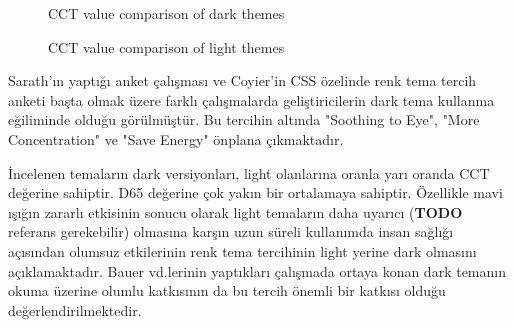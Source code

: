 \documentclass{article}
\begin{document}
\begin{figure}[H]
  \caption{CCT value comparison of dark themes}
  \label{fig:dark-compare}
\end{figure}

\lighttable
\pgfplotstabletranspose[colnames from=themes]\tablelight{\lighttable}

\begin{figure}[H]
  \caption{CCT value comparison of light themes}
  \label{fig:light-compare}
\end{figure}

Sarath'ın yaptığı anket çalışması \cite{sarath2016prefer} ve Coyier'in CSS özelinde renk tema tercih anketi \cite{coyier2013poll} başta olmak üzere farklı çalışmalarda geliştiricilerin dark tema kullanma eğiliminde olduğu görülmüştür. Bu tercihin altında "Soothing to Eye", "More Concentration" ve "Save Energy" önplana çıkmaktadır.

İncelenen temaların dark versiyonları, light olanlarına oranla yarı oranda CCT değerine sahiptir. D65 değerine çok yakın bir ortalamaya sahiptir. Özellikle mavi ışığın zararlı etkisinin sonucu olarak light temaların daha uyarıcı (\textbf{TODO} referans gerekebilir) olmasına karşın uzun süreli kullanımda insan sağlığı açısından olumsuz etkilerinin renk tema tercihinin light yerine dark olmasını açıklamaktadır. Bauer vd.lerinin \cite{bauer1980improving} yaptıkları çalışmada ortaya konan dark temanın okuma üzerine olumlu katkısının da bu tercih önemli bir katkısı olduğu değerlendirilmektedir.
\end{document}

